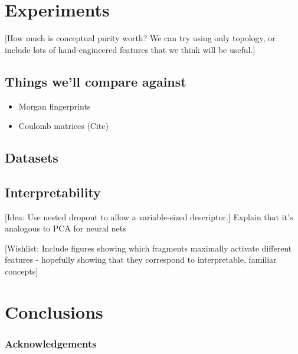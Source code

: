\documentclass{article}
\begin{document}
\section{Experiments}

[How much is conceptual purity worth?  We can try using only topology, or include lots of hand-engineered features that we think will be useful.]

\subsection{Things we'll compare against}

\begin{itemize}
\item Morgan fingerprints
\item Coulomb matrices (Cite)
\end{itemize}

\subsection{Datasets}

\subsection{Interpretability}

[Idea: Use nested dropout to allow a variable-sized descriptor.]
Explain that it's analogous to PCA for neural nets


[Wishlist: Include figures showing which fragments maximally activate different features - hopefully showing that they correspond to interpretable, familiar concepts]


\section{Conclusions}


\subsubsection*{Acknowledgements}



\end{document}
